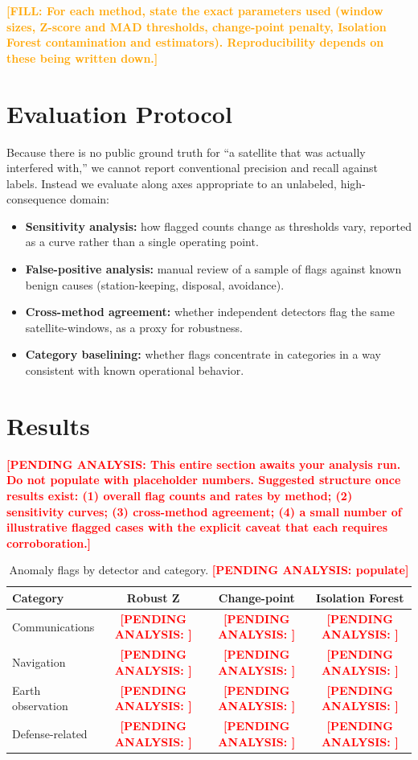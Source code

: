 \documentclass[11pt]{article}
\newcommand{\pending}[1]{\textcolor{red}{\textbf{[PENDING ANALYSIS: #1]}}}
\newcommand{\fill}[1]{\textcolor{orange}{\textbf{[FILL: #1]}}}
\begin{document}
\fill{For each method, state the exact parameters used (window sizes, Z-score and
MAD thresholds, change-point penalty, Isolation Forest contamination and
estimators). Reproducibility depends on these being written down.}

\section{Evaluation Protocol}
\label{sec:eval}

Because there is no public ground truth for ``a satellite that was actually
interfered with,'' we cannot report conventional precision and recall against
labels. Instead we evaluate along axes appropriate to an unlabeled,
high-consequence domain:

\begin{itemize}[leftmargin=*]
  \item \textbf{Sensitivity analysis:} how flagged counts change as thresholds
        vary, reported as a curve rather than a single operating point.
  \item \textbf{False-positive analysis:} manual review of a sample of flags
        against known benign causes (station-keeping, disposal, avoidance).
  \item \textbf{Cross-method agreement:} whether independent detectors flag the
        same satellite-windows, as a proxy for robustness.
  \item \textbf{Category baselining:} whether flags concentrate in categories in
        a way consistent with known operational behavior.
\end{itemize}

\section{Results}
\pending{This entire section awaits your analysis run. Do not populate with
placeholder numbers. Suggested structure once results exist: (1) overall flag
counts and rates by method; (2) sensitivity curves; (3) cross-method agreement;
(4) a small number of illustrative flagged cases with the explicit caveat that
each requires corroboration.}

\begin{table}[h]
\centering
\caption{Anomaly flags by detector and category. \pending{populate}}
\begin{tabular}{@{}lccc@{}}
\toprule
\textbf{Category} & \textbf{Robust Z} & \textbf{Change-point} & \textbf{Isolation Forest} \\
\midrule
Communications & \pending{} & \pending{} & \pending{} \\
Navigation & \pending{} & \pending{} & \pending{} \\
Earth observation & \pending{} & \pending{} & \pending{} \\
Defense-related & \pending{} & \pending{} & \pending{} \\
\bottomrule
\end{tabular}
\end{table}
\end{document}
